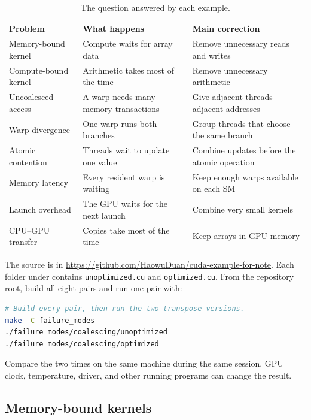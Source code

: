 \documentclass[11pt]{article}
\numberwithin{equation}{section}
\numberwithin{figure}{section}
\numberwithin{table}{section}
\newcommand{\code}[1]{\texttt{#1}}
\begin{document}
\begin{table}[htbp]
  \centering
  \small
  \caption{The question answered by each example.}
  \begin{tabularx}{\textwidth}{@{}>{\raggedright\arraybackslash}p{}YY@{}}
    \toprule
    \textbf{Problem} & \textbf{What happens} & \textbf{Main correction} \\
    \midrule
    Memory-bound kernel & Compute waits for array data & Remove unnecessary reads and writes \\
    Compute-bound kernel & Arithmetic takes most of the time & Remove unnecessary arithmetic \\
    Uncoalesced access & A warp needs many memory transactions & Give adjacent threads adjacent addresses \\
    Warp divergence & One warp runs both branches & Group threads that choose the same branch \\
    Atomic contention & Threads wait to update one value & Combine updates before the atomic operation \\
    Memory latency & Every resident warp is waiting & Keep enough warps available on each SM \\
    Launch overhead & The GPU waits for the next launch & Combine very small kernels \\
    CPU--GPU transfer & Copies take most of the time & Keep arrays in GPU memory \\
    \bottomrule
  \end{tabularx}
\end{table}

The source is in
\url{https://github.com/HaowuDuan/cuda-example-for-note}.  Each folder under
 contains \code{unoptimized.cu} and \code{optimized.cu}.
From the repository root, build all eight pairs and run one pair with:
\begin{lstlisting}[language=bash,numbers=none]
# Build every pair, then run the two transpose versions.
make -C failure_modes
./failure_modes/coalescing/unoptimized
./failure_modes/coalescing/optimized
\end{lstlisting}
Compare the two times on the same machine during the same session.  GPU clock,
temperature, driver, and other running programs can change the result.

\subsection{Memory-bound kernels}
\end{document}
